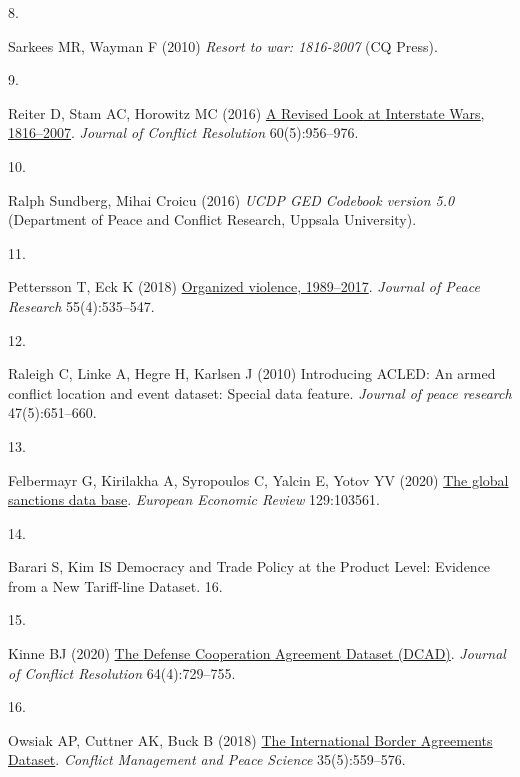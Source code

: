\documentclass{article}
\newlength{\cslhangindent}
\newlength{\csllabelwidth}
\newlength{\cslentryspacingunit} %
\newenvironment{CSLReferences}[2] %
 {%
  \setlength{\parindent}{0pt}
  \ifodd #1
  \let\oldpar\par
  \def\par{\hangindent=\cslhangindent\oldpar}
  \fi
  \setlength{\parskip}{#2\cslentryspacingunit}
 }%
 {}
\newcommand{\CSLLeftMargin}[1]{\parbox[t]{\csllabelwidth}{#1}}
\newcommand{\CSLRightInline}[1]{\parbox[t]{\linewidth - \csllabelwidth}{#1}\break}
\begin{document}
\begin{CSLReferences}{0}{0}
\leavevmode{}%
\CSLLeftMargin{8. }
\CSLRightInline{Sarkees MR, Wayman F (2010) \emph{Resort to war:
1816-2007} ({CQ Press}).}

\leavevmode{}%
\CSLLeftMargin{9. }
\CSLRightInline{Reiter D, Stam AC, Horowitz MC (2016)
\href{https://doi.org/10.1177/0022002714553107}{A {Revised Look} at
{Interstate Wars}, 1816--2007}. \emph{Journal of Conflict Resolution}
60(5):956--976.}

\leavevmode{}%
\CSLLeftMargin{10. }
\CSLRightInline{Ralph Sundberg, Mihai Croicu (2016) \emph{{UCDP GED
Codebook} version 5.0} ({Department of Peace and Conflict Research,
Uppsala University}).}

\leavevmode{}%
\CSLLeftMargin{11. }
\CSLRightInline{Pettersson T, Eck K (2018)
\href{https://doi.org/10.1177/0022343318784101}{Organized violence,
1989--2017}. \emph{Journal of Peace Research} 55(4):535--547.}

\leavevmode{}%
\CSLLeftMargin{12. }
\CSLRightInline{Raleigh C, Linke A, Hegre H, Karlsen J (2010)
Introducing {ACLED}: An armed conflict location and event dataset:
Special data feature. \emph{Journal of peace research} 47(5):651--660.}

\leavevmode{}%
\CSLLeftMargin{13. }
\CSLRightInline{Felbermayr G, Kirilakha A, Syropoulos C, Yalcin E, Yotov
YV (2020) \href{https://doi.org/10.1016/j.euroecorev.2020.103561}{The
global sanctions data base}. \emph{European Economic Review}
129:103561.}

\leavevmode{}%
\CSLLeftMargin{14. }
\CSLRightInline{Barari S, Kim IS Democracy and {Trade Policy} at the
{Product Level}: {Evidence} from a {New Tariff-line Dataset}. 16.}

\leavevmode{}%
\CSLLeftMargin{15. }
\CSLRightInline{Kinne BJ (2020)
\href{https://doi.org/10.1177/0022002719857796}{The {Defense Cooperation
Agreement Dataset} ({DCAD})}. \emph{Journal of Conflict Resolution}
64(4):729--755.}

\leavevmode{}%
\CSLLeftMargin{16. }
\CSLRightInline{Owsiak AP, Cuttner AK, Buck B (2018)
\href{https://doi.org/10.1177/0738894216646978}{The {International
Border Agreements Dataset}}. \emph{Conflict Management and Peace
Science} 35(5):559--576.}


\end{CSLReferences}
\end{document}
